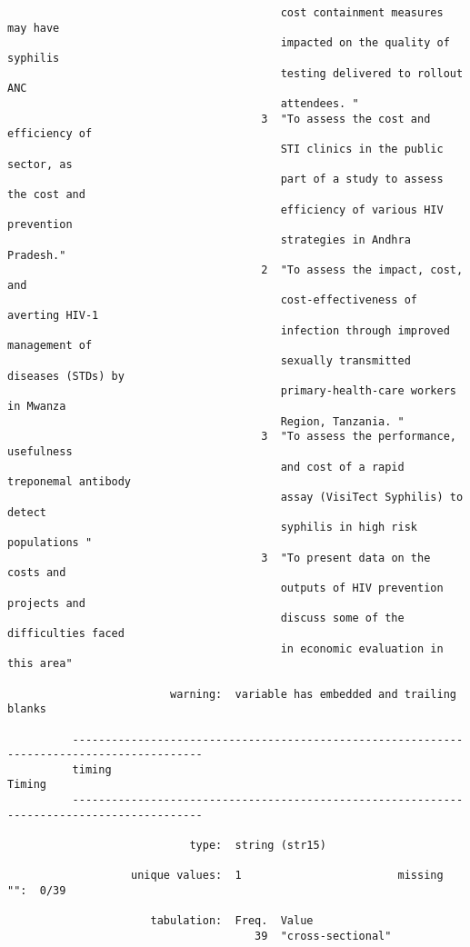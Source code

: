\documentclass{article}
\begin{document}
\begin{verbatim}
                                          cost containment measures may have
                                          impacted on the quality of syphilis
                                          testing delivered to rollout ANC
                                          attendees. "
                                       3  "To assess the cost and efficiency of
                                          STI clinics in the public sector, as
                                          part of a study to assess the cost and
                                          efficiency of various HIV prevention
                                          strategies in Andhra Pradesh."
                                       2  "To assess the impact, cost, and
                                          cost-effectiveness of averting HIV-1
                                          infection through improved management of
                                          sexually transmitted diseases (STDs) by
                                          primary-health-care workers in Mwanza
                                          Region, Tanzania. "
                                       3  "To assess the performance, usefulness
                                          and cost of a rapid treponemal antibody
                                          assay (VisiTect Syphilis) to detect
                                          syphilis in high risk populations "
                                       3  "To present data on the costs and
                                          outputs of HIV prevention projects and
                                          discuss some of the difficulties faced
                                          in economic evaluation in this area"
          
                         warning:  variable has embedded and trailing blanks
          
          ------------------------------------------------------------------------------------------
          timing                                                                              Timing
          ------------------------------------------------------------------------------------------
          
                            type:  string (str15)
          
                   unique values:  1                        missing "":  0/39
          
                      tabulation:  Freq.  Value
                                      39  "cross-sectional"
          

\end{verbatim}
\end{document}
